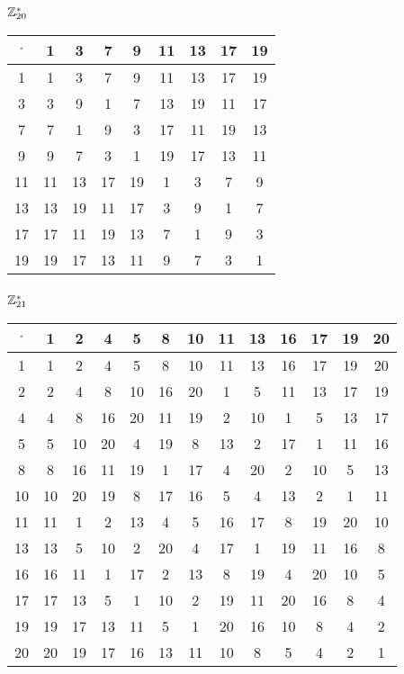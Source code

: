 \subsubsection{$\mathbb{Z}_{20}^*$}
\begin{tabular}{|c|c|c|c|c|c|c|c|c|}
\hline $\cdot$  & 1 & 3 & 7 & 9 & 11 & 13 & 17 & 19\\
\hline 1 & 1 & 3 & 7 & 9 & 11 & 13 & 17 & 19\\
\hline 3 & 3 & 9 & 1 & 7 & 13 & 19 & 11 & 17\\
\hline 7 & 7 & 1 & 9 & 3 & 17 & 11 & 19 & 13\\
\hline 9 & 9 & 7 & 3 & 1 & 19 & 17 & 13 & 11\\
\hline 11 & 11 & 13 & 17 & 19 & 1 & 3 & 7 & 9\\
\hline 13 & 13 & 19 & 11 & 17 & 3 & 9 & 1 & 7\\
\hline 17 & 17 & 11 & 19 & 13 & 7 & 1 & 9 & 3\\
\hline 19 & 19 & 17 & 13 & 11 & 9 & 7 & 3 & 1\\
\hline
\end{tabular}


\subsubsection{$\mathbb{Z}_{21}^*$}
\begin{tabular}{|c|c|c|c|c|c|c|c|c|c|c|c|c|}
\hline $\cdot$  & 1 & 2 & 4 & 5 & 8 & 10 & 11 & 13 & 16 & 17 & 19 & 20\\
\hline 1 & 1 & 2 & 4 & 5 & 8 & 10 & 11 & 13 & 16 & 17 & 19 & 20\\
\hline 2 & 2 & 4 & 8 & 10 & 16 & 20 & 1 & 5 & 11 & 13 & 17 & 19\\
\hline 4 & 4 & 8 & 16 & 20 & 11 & 19 & 2 & 10 & 1 & 5 & 13 & 17\\
\hline 5 & 5 & 10 & 20 & 4 & 19 & 8 & 13 & 2 & 17 & 1 & 11 & 16\\
\hline 8 & 8 & 16 & 11 & 19 & 1 & 17 & 4 & 20 & 2 & 10 & 5 & 13\\
\hline 10 & 10 & 20 & 19 & 8 & 17 & 16 & 5 & 4 & 13 & 2 & 1 & 11\\
\hline 11 & 11 & 1 & 2 & 13 & 4 & 5 & 16 & 17 & 8 & 19 & 20 & 10\\
\hline 13 & 13 & 5 & 10 & 2 & 20 & 4 & 17 & 1 & 19 & 11 & 16 & 8\\
\hline 16 & 16 & 11 & 1 & 17 & 2 & 13 & 8 & 19 & 4 & 20 & 10 & 5\\
\hline 17 & 17 & 13 & 5 & 1 & 10 & 2 & 19 & 11 & 20 & 16 & 8 & 4\\
\hline 19 & 19 & 17 & 13 & 11 & 5 & 1 & 20 & 16 & 10 & 8 & 4 & 2\\
\hline 20 & 20 & 19 & 17 & 16 & 13 & 11 & 10 & 8 & 5 & 4 & 2 & 1\\
\hline
\end{tabular}


